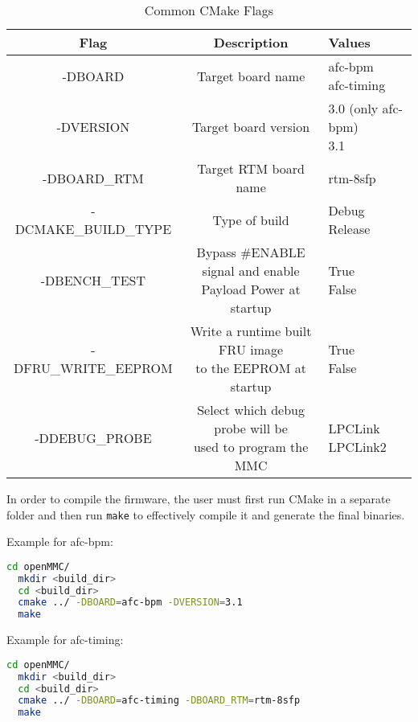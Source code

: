 \documentclass[letterpaper,12pt, titlepage]{article}
\begin{document}
\begin{table}[ht]
  \begin{center}
    \caption{Common CMake Flags}
    \label{tbl:cmake-flags}
    \begin{tabular}{|c|c|l|}
      \hline
      \textbf{Flag} & \textbf{Description} & \textbf{Values}\\
      \hline
      -DBOARD & Target board name & \makecell[l]{afc-bpm\\afc-timing}\\
      \hline
      -DVERSION & Target board version & \makecell[l]{3.0 (only afc-bpm)\\3.1}\\
      \hline
      -DBOARD\_RTM & Target RTM board name & rtm-8sfp\\
      \hline
      -DCMAKE\_BUILD\_TYPE & Type of build & \makecell[l]{Debug\\Release}\\
      \hline
      -DBENCH\_TEST & \makecell{Bypass \#ENABLE signal and enable\\Payload Power at startup} & \makecell[l]{True\\False}\\
      \hline
      -DFRU\_WRITE\_EEPROM & \makecell{Write a runtime built FRU image\\ to the EEPROM at startup} & \makecell[l]{True\\False}\\
      \hline
      -DDEBUG\_PROBE & \makecell{Select which debug probe will be \\ used to program the MMC} & \makecell[l]{LPCLink\\LPCLink2}\\
      \hline
    \end{tabular}
  \end{center}
\end{table}

In order to compile the firmware, the user must first run CMake in a separate folder and then run \texttt{make} to effectively compile it and generate the final binaries.

Example for afc-bpm:
\begin{lstlisting}[language=bash]
  cd openMMC/
  mkdir <build_dir>
  cd <build_dir>
  cmake ../ -DBOARD=afc-bpm -DVERSION=3.1
  make
\end{lstlisting}

Example for afc-timing:
\begin{lstlisting}[language=bash]
  cd openMMC/
  mkdir <build_dir>
  cd <build_dir>
  cmake ../ -DBOARD=afc-timing -DBOARD_RTM=rtm-8sfp
  make
\end{lstlisting}
\end{document}
